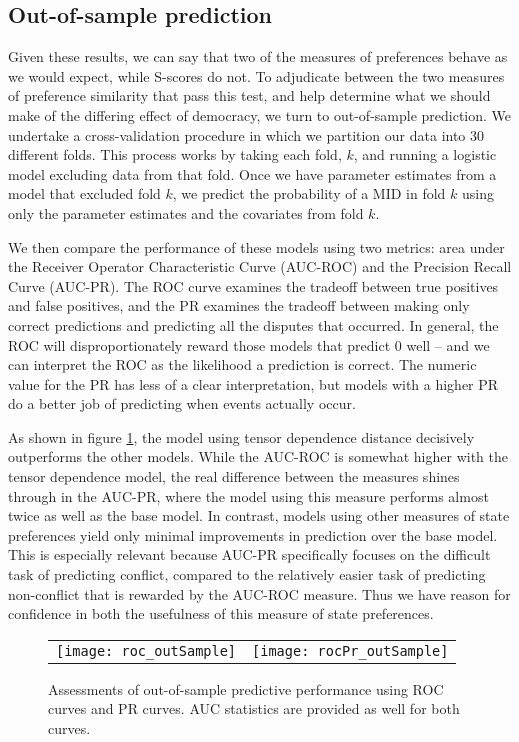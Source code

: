 \subsection*{Out-of-sample prediction}

Given these results, we can say that two of the measures of preferences behave as we would expect, while S-scores do not. To adjudicate between the two measures of preference similarity that pass this test, and help determine what we should make of the differing effect of democracy, we turn to out-of-sample prediction. We undertake a cross-validation procedure in which we partition our data into 30 different folds. This process works by taking each fold, $k$, and running a logistic model excluding data from that fold. Once we have parameter estimates from a model that excluded fold $k$, we predict the probability of a MID in fold $k$ using only the parameter estimates and the covariates from fold $k$.

We then compare the performance of these models using two metrics: area under the Receiver Operator Characteristic Curve (AUC-ROC) and the Precision Recall Curve (AUC-PR). The ROC curve examines the tradeoff between true positives and false positives, and the PR examines the tradeoff between making only correct predictions and predicting all the disputes that occurred. In general, the ROC will disproportionately reward those models that predict $0$ well -- and we can interpret the ROC as the likelihood a prediction is correct. The numeric value for the PR has less of a clear interpretation, but models with a higher PR do a better job of predicting when events actually occur.

As shown in figure \ref{fig:roc}, the model using tensor dependence distance decisively outperforms the other models. While the AUC-ROC is somewhat higher with the tensor dependence model, the real difference between the measures shines through in the AUC-PR, where the model using this measure performs almost twice as well as the base model. In contrast, models using other measures of state preferences yield only minimal improvements in prediction over the base model. This is especially relevant because AUC-PR specifically focuses on the difficult task of predicting conflict, compared to the relatively easier task of predicting non-conflict that is rewarded by the AUC-ROC measure. Thus we have reason for confidence in both the usefulness of this measure of state preferences.

\begin{figure}[ht]
	\centering
	\begin{tabular}{cc}
	\texttt{[image: roc\_outSample]} &
	\texttt{[image: rocPr\_outSample]}
	\end{tabular}
	\caption{Assessments of out-of-sample predictive performance using ROC curves and PR curves. AUC statistics are provided as well for both curves.}
	\label{fig:roc}
\end{figure}
\FloatBarrier
